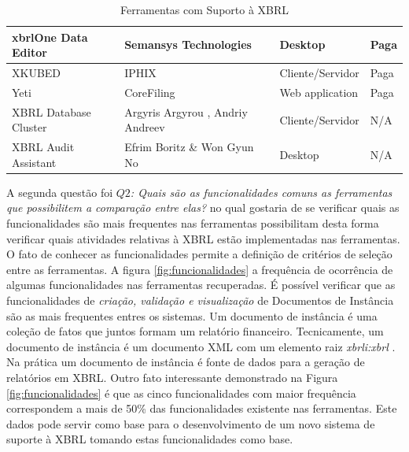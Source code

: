 \documentclass[12pt]{article}
\begin{document}
\begin{table}[htb]
{\begin{tabular}{|l|l|l|l|}
xbrlOne Data Editor                               & Semansys Technologies                       & Desktop                                   & Paga                                  \\ \hline
XKUBED                                            & IPHIX                                       & Cliente/Servidor                          & Paga                                  \\ \hline
Yeti                                              & CoreFiling                                  & Web application                           & Paga                                  \\ \hline
XBRL Database Cluster                             & Argyris Argyrou , Andriy Andreev            & Cliente/Servidor                          & N/A                                   \\ \hline
XBRL Audit Assistant                              & Efrim Boritz \& Won Gyun No                 & Desktop                                   & N/A                                   \\ \hline
\end{tabular}
}
\caption{Ferramentas com Suporto à XBRL}
\label{tab:ferramentas}
\end{table}

A segunda questão foi \textit{$Q2$: Quais são as funcionalidades comuns as ferramentas
    que possibilitem a comparação entre elas?} no qual gostaria de se verificar
  quais as funcionalidades são mais frequentes nas ferramentas possibilitam
  desta forma verificar quais atividades relativas à XBRL estão implementadas
  nas ferramentas. O fato de conhecer as funcionalidades permite a definição de
  critérios de seleção entre as ferramentas. A figura \ref{fig:funcionalidades}
  a frequência de ocorrência de algumas funcionalidades nas ferramentas
  recuperadas. É possível verificar que as funcionalidades de \textit{criação,
    validação e visualização} de Documentos de Instância são as mais frequentes
  entres os sistemas. Um documento de instância é uma coleção de fatos que
  juntos formam um relatório financeiro. Tecnicamente, um documento de
  instância é um documento XML com um elemento raiz \textit{xbrli:xbrl}
  \cite{xbrl_conceitos_aplicacoes}. Na prática um documento de instância é
  fonte de dados para a geração de relatórios em XBRL. Outro fato interessante
  demonstrado na Figura \ref{fig:funcionalidades} é que as cinco
  funcionalidades com maior frequência correspondem a mais de 50\% das
  funcionalidades existente nas ferramentas. Este dados pode servir como base
  para o desenvolvimento de um novo sistema de suporte à XBRL tomando estas
  funcionalidades como base.
\end{document}
